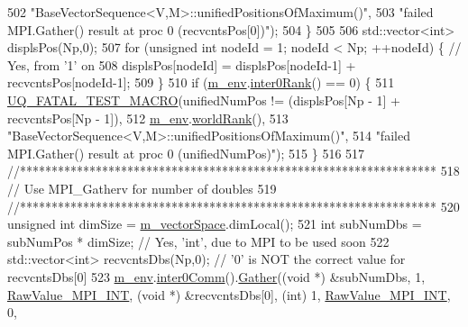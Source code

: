 \begin{DoxyCode}
502                         \textcolor{stringliteral}{"BaseVectorSequence<V,M>::unifiedPositionsOfMaximum()"},
503                         \textcolor{stringliteral}{"failed MPI.Gather() result at proc 0 (recvcntsPos[0])"});
504   \}
505 
506   std::vector<int> displsPos(Np,0);
507   \textcolor{keywordflow}{for} (\textcolor{keywordtype}{unsigned} \textcolor{keywordtype}{int} nodeId = 1; nodeId < Np; ++nodeId) \{ \textcolor{comment}{// Yes, from '1' on}
508     displsPos[nodeId] = displsPos[nodeId-1] + recvcntsPos[nodeId-1];
509   \}
510   \textcolor{keywordflow}{if} (\hyperlink{class_q_u_e_s_o_1_1_base_vector_sequence_a8e8824d2a63c5a43bcc6473e3a0491e8}{m\_env}.\hyperlink{class_q_u_e_s_o_1_1_base_environment_ae106b5bb8a80b655b88b3a26b1e7c185}{inter0Rank}() == 0) \{
511     \hyperlink{_defines_8h_a56d63d18d0a6d45757de47fcc06f574d}{UQ\_FATAL\_TEST\_MACRO}(unifiedNumPos != (displsPos[Np - 1] + recvcntsPos[Np - 1]),
512                         \hyperlink{class_q_u_e_s_o_1_1_base_vector_sequence_a8e8824d2a63c5a43bcc6473e3a0491e8}{m\_env}.\hyperlink{class_q_u_e_s_o_1_1_base_environment_a78b57112bbd0e6dd0e8afec00b40ffa7}{worldRank}(),
513                         \textcolor{stringliteral}{"BaseVectorSequence<V,M>::unifiedPositionsOfMaximum()"},
514                         \textcolor{stringliteral}{"failed MPI.Gather() result at proc 0 (unifiedNumPos)"});
515   \}
516 
517   \textcolor{comment}{//******************************************************************}
518   \textcolor{comment}{// Use MPI\_Gatherv for number of doubles}
519   \textcolor{comment}{//******************************************************************}
520   \textcolor{keywordtype}{unsigned} \textcolor{keywordtype}{int} dimSize = \hyperlink{class_q_u_e_s_o_1_1_base_vector_sequence_a4bd171e39ed050ff105c808336f35198}{m\_vectorSpace}.dimLocal();
521   \textcolor{keywordtype}{int} subNumDbs = subNumPos * dimSize; \textcolor{comment}{// Yes, 'int', due to MPI to be used soon}
522   std::vector<int> recvcntsDbs(Np,0); \textcolor{comment}{// '0' is NOT the correct value for recvcntsDbs[0]}
523   \hyperlink{class_q_u_e_s_o_1_1_base_vector_sequence_a8e8824d2a63c5a43bcc6473e3a0491e8}{m\_env}.\hyperlink{class_q_u_e_s_o_1_1_base_environment_a689e4d140c74d495d97eb498714a4b82}{inter0Comm}().\hyperlink{class_q_u_e_s_o_1_1_mpi_comm_a184a5e411afcfb6dc41e99fca9435045}{Gather}((\textcolor{keywordtype}{void} *) &subNumDbs, 1, 
      \hyperlink{_mpi_comm_8h_a1f067da7be967aa1ff144738cadd3e57}{RawValue\_MPI\_INT}, (\textcolor{keywordtype}{void} *) &recvcntsDbs[0], (\textcolor{keywordtype}{int}) 1, 
      \hyperlink{_mpi_comm_8h_a1f067da7be967aa1ff144738cadd3e57}{RawValue\_MPI\_INT}, 0,

\end{DoxyCode}
